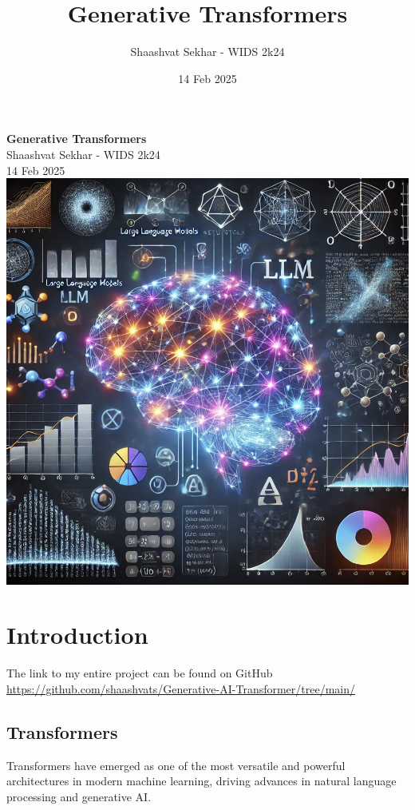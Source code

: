 \documentclass[12pt,a4paper]{article}
\title{Generative Transformers}
\author{Shaashvat Sekhar - WIDS 2k24}
\date{14 Feb 2025}
\begin{document}
\begin{titlepage}
    \centering
    \vspace*{1cm}
    {\Huge \textbf{Generative Transformers}}\\[1cm]
    {\Large Shaashvat Sekhar - WIDS 2k24}\\[1cm]
    {\large 14 Feb 2025}\\[1cm]
    \includegraphics[width=1\textwidth]{cover}\\[1cm]
    \vfill
\end{titlepage}
\tableofcontents
\pagebreak
\section{Introduction}
The link to my entire project can be found on GitHub \\

\url{https://github.com/shaashvats/Generative-AI-Transformer/tree/main/}
\subsection{Transformers}
Transformers have emerged as one of the most versatile and powerful architectures in modern machine learning, driving advances in natural language processing and generative AI. \\
\end{document}
